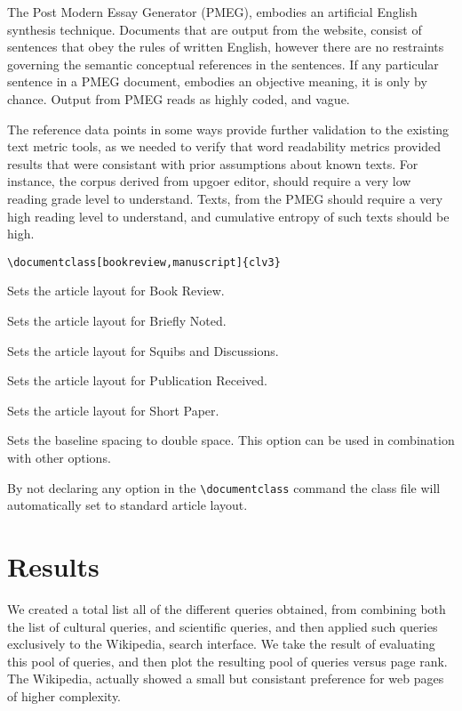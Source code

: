 \documentclass{clv3}
\begin{document}
The Post Modern Essay Generator (PMEG), embodies an artificial English synthesis technique. Documents that are output from the website, consist of sentences that obey the rules of written English, however there are no restraints governing the semantic conceptual references in the sentences. If any particular sentence in a PMEG document, embodies an objective meaning, it is only by chance. Output from PMEG reads as highly coded, and vague.

The reference data points in some ways provide further validation to the existing text metric tools, as we needed to verify that word readability metrics provided results that were consistant with prior assumptions about known texts. For instance, the corpus derived from upgoer editor, should require a very low reading grade level to understand. Texts, from the PMEG should require a very high reading level to understand, and cumulative entropy of such texts should be high.


\verb|\documentclass[bookreview,manuscript]{clv3}|


\begin{deflist}
\item[bookreview] Sets the article layout for Book Review.
\item[brief] Sets the article layout for Briefly Noted.
\item[discussion] Sets the article layout for Squibs and Discussions.
\item[pubrec] Sets the article layout for Publication Received.
\item[shortpaper] Sets the article layout for Short Paper.
\item[manuscript] Sets the baseline spacing to double space. This
option can be used in combination with other options.
\end{deflist}

By not declaring any option in the \verb|\documentclass| command the class file
will automatically set to standard article layout.

\section{Results}

We created a total list all of the different queries obtained, from combining both the list of cultural queries, and scientific queries, and then applied such queries exclusively to the Wikipedia, search interface. We take the result of evaluating this pool of queries, and then plot the resulting pool of queries versus page rank. The Wikipedia, actually showed a small but consistant preference for web pages of higher complexity.
\end{document}
